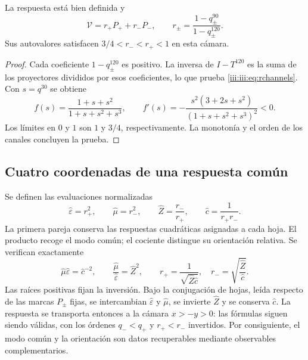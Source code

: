 \begin{proposition}
La respuesta está bien definida y
\begin{equation}
 \mathcal V=r_+P_++r_-P_-,\qquad
 r_\pm=\frac{1-q_\pm^{90}}{1-q_\pm^{120}}.
 \label{iii:iii:eq:rchannels}
\end{equation}
Sus autovalores satisfacen $3/4<r_-<r_+<1$ en esta cámara.
\end{proposition}
\begin{proof}
Cada coeficiente $1-q_\pm^{120}$ es positivo. La inversa de $I-T^{120}$
es la suma de los proyectores divididos por esos coeficientes, lo que prueba
\eqref{iii:iii:eq:rchannels}. Con $s=q^{30}$ se obtiene
\begin{equation}
 f(s)=\frac{1+s+s^2}{1+s+s^2+s^3},\qquad
 f'(s)=-\frac{s^2(3+2s+s^2)}{(1+s+s^2+s^3)^2}<0.
 \label{iii:iii:eq:monotone}
\end{equation}
Los límites en $0$ y $1$ son $1$ y $3/4$, respectivamente. La monotonía
y el orden de los canales concluyen la prueba.
\end{proof}

\subsection{Cuatro coordenadas de una respuesta común}

Se definen las evaluaciones normalizadas
\begin{equation}
 \widehat\varepsilon=r_+^2,\qquad
 \widehat\mu=r_-^2,\qquad
 \widehat Z=\frac{r_-}{r_+},\qquad
 \widehat c=\frac1{r_+r_-}.
 \label{iii:iii:eq:four}
\end{equation}
La primera pareja conserva las respuestas cuadráticas asignadas a cada hoja.
El producto recoge el modo común; el cociente distingue su orientación relativa.
Se verifican exactamente
\begin{equation}
 \widehat\mu\widehat\varepsilon=\widehat c^{-2},\qquad
 \frac{\widehat\mu}{\widehat\varepsilon}=\widehat Z^2,
 \qquad
 r_+=\frac1{\sqrt{\widehat Z\widehat c}},\quad
 r_-=\sqrt{\frac{\widehat Z}{\widehat c}}.
 \label{iii:iii:eq:four-identities}
\end{equation}
Las raíces positivas fijan la inversión. Bajo la conjugación de hojas,
leída respecto de las marcas $P_\pm$ fijas, se
intercambian $\widehat\varepsilon$ y $\widehat\mu$, se invierte
$\widehat Z$ y se conserva $\widehat c$. La respuesta se transporta entonces
a la cámara $x>-y>0$: las fórmulas siguen siendo válidas, con los órdenes
$q_-<q_+$ y $r_+<r_-$ invertidos. Por consiguiente, el modo común
y la orientación son datos recuperables mediante observables complementarios.

